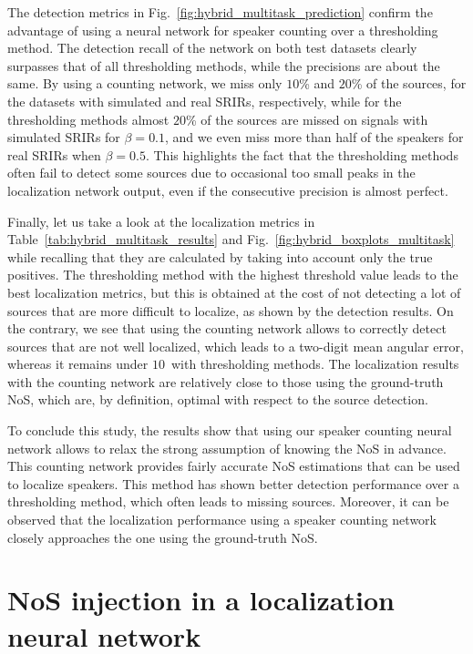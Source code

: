 The detection metrics in Fig.~\ref{fig:hybrid_multitask_prediction} confirm the advantage of using a neural network for speaker counting over a thresholding method. The detection recall of the network on both test datasets clearly surpasses that of all thresholding methods, while the precisions are about the same. By using a counting network, we miss only $10$\% and $20$\% of the sources, for the datasets with simulated and real SRIRs, respectively, while for the thresholding methods almost $20$\% of the sources are missed on signals with simulated SRIRs for $\beta=0.1$, and we even miss more than half of the speakers for real SRIRs when $\beta=0.5$. This highlights the fact that the thresholding methods often fail to detect some sources due to occasional too small peaks in the localization network output, even if the consecutive precision is almost perfect.

Finally, let us take a look at the localization metrics in Table~\ref{tab:hybrid_multitask_results} and Fig.~\ref{fig:hybrid_boxplots_multitask} while recalling that they are calculated by taking into account only the true positives. The thresholding method with the highest threshold value leads to the best localization metrics, but this is obtained at the cost of not detecting a lot of sources that are more difficult to localize, as shown by the detection results. On the contrary, we see that using the counting network allows to correctly detect sources that are not well localized, which leads to a two-digit mean angular error, whereas it remains under $10$\textdegree~with thresholding methods. The localization results with the counting network are relatively close to those using the ground-truth NoS, which are, by definition, optimal with respect to the source detection.

To conclude this study, the results show that using our speaker counting neural network allows to relax the strong assumption of knowing the NoS in advance. This counting network provides fairly accurate NoS estimations that can be used to localize speakers. This method has shown better detection performance over a thresholding method, which often leads to missing sources. Moreover, it can be observed that the localization performance using a speaker counting network closely approaches the one using the ground-truth NoS.

\section{NoS injection in a localization neural network}
\label{sec:nosInjection}
